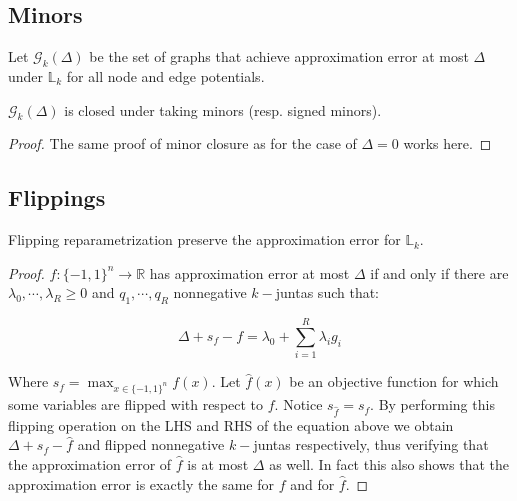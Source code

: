 \subsection{Minors}

Let $\mathcal{G}_k(\Delta)$ be the set of graphs that achieve approximation error at most $\Delta$ under $\mathbb{L}_k$ for all node and edge potentials. 

\begin{theorem}
$\mathcal{G}_k(\Delta)$ is closed under taking minors (resp. signed minors). 
\end{theorem}

\begin{proof}
The same proof of minor closure as for the case of $\Delta = 0$ works here.
\end{proof}

\subsection{Flippings}

\begin{lemma}
Flipping reparametrization preserve the approximation error for $\mathbb{L}_k$.
\end{lemma}

\begin{proof}
$f :\{-1,1\}^n \rightarrow \mathbb{R}$ has approximation error at most $\Delta$ if and only if there are $\lambda_0, \cdots, \lambda_R \geq 0$ and $q_1, \cdots, q_R$ nonnegative $k-$juntas such that:

\begin{equation}
\Delta + s_f - f = \lambda_0 + \sum_{i=1}^R \lambda_i g_i
\end{equation}

Where $s_f = \max_{x \in \{-1,1\}^n} f(x)$. Let $\hat{f}(x)$ be an objective function for which some variables are flipped with respect to $f$. Notice $s_{\hat{f}} = s_f$. By performing this flipping operation on the LHS and RHS of the equation above we obtain $\Delta + s_f - \hat{f}$ and flipped nonnegative $k-$juntas respectively, thus verifying that the approximation error of $\hat{f}$ is at most $\Delta$ as well. In fact this also shows that the approximation error is exactly the same for $f$ and for $\hat{f}$.
\end{proof}











